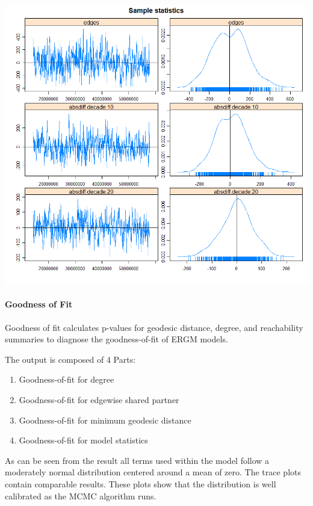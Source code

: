 \documentclass[
  english,
  man,floatsintext]{apa6}
\providecommand{\tightlist}{%
  \setlength{\itemsep}{0pt}\setlength{\parskip}{0pt}}
\let\oldparagraph\paragraph
\renewcommand{\paragraph}[1]{\oldparagraph{#1}\mbox{}}
\begin{document}
\includegraphics{ergm_result/mcmc_diagnostics_3.png}

\hypertarget{goodness-of-fit}{%
\paragraph{Goodness of Fit}\label{goodness-of-fit}}

Goodness of fit calculates p-values for geodesic distance, degree, and reachability summaries to diagnose the goodness-of-fit of ERGM models.

The output is composed of 4 Parts:

\begin{enumerate}
\def\labelenumi{\arabic{enumi}.}
\tightlist
\item
  Goodness-of-fit for degree
\item
  Goodness-of-fit for edgewise shared partner
\item
  Goodness-of-fit for minimum geodesic distance
\item
  Goodness-of-fit for model statistics
\end{enumerate}

As can be seen from the result all terms used within the model follow a moderately normal distribution centered around a mean of zero. The trace plots contain comparable results. These plots show that the distribution is well calibrated as the MCMC algorithm runs.
\end{document}
